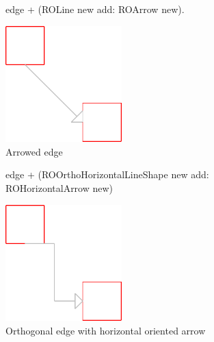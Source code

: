 \documentclass[a4paper,10pt,twoside]{book}
\begin{document}
\begin{figure}[H]
      \begin{minipage}[t]{0.5\textwidth}
      \vspace{0pt}
     \begin{code}{}
edge + (ROLine new add: ROArrow new). \end{code}
   \end{minipage}
   \hfill
   \begin{minipage}[t]{0.4\textwidth}
      \vspace{0pt} \raggedright
       \centering
		\includegraphics[width=0.4\textwidth]{arrowEdge}
   \end{minipage}
\caption{Arrowed edge}
\label{fig:arrowEdge}
\end{figure} 

\begin{figure}[H]
      \begin{minipage}[t]{0.5\textwidth}
      \vspace{0pt}
     \begin{code}{}
edge + (ROOrthoHorizontalLineShape new add: ROHorizontalArrow new)\end{code}
   \end{minipage}
   \hfill
   \begin{minipage}[t]{0.4\textwidth}
      \vspace{0pt} \raggedright
       \centering
		\includegraphics[width=0.4\textwidth]{orthoEdge}
   \end{minipage}
\caption{Orthogonal edge with horizontal oriented arrow}
\label{fig:orthoEdge}
\end{figure} 
\end{document}
